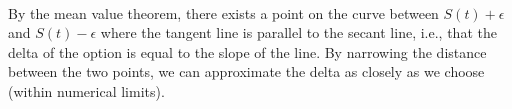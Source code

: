 \documentclass[11pt]{article}
\begin{document}
 \\

By the mean value theorem, there exists a point on the curve between $S(t) + \epsilon$ and $S(t) - \epsilon$ where the tangent line is parallel to the secant line, i.e., that the delta of the option is equal to the slope of the line. By narrowing the distance between the two points, we can approximate the delta as closely as we choose (within numerical limits).
\end{document}
